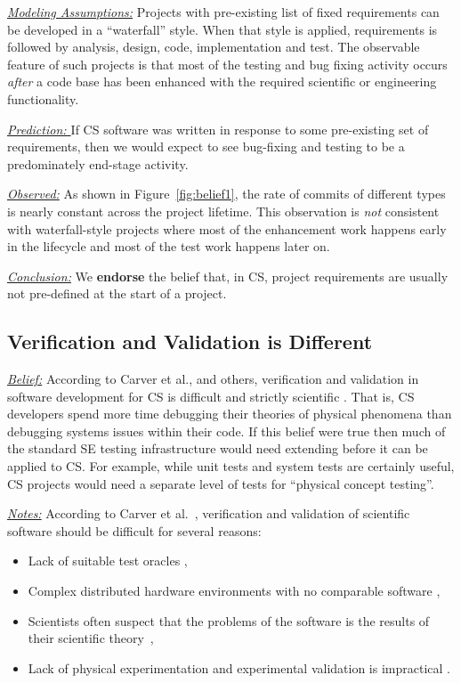 \documentclass[sigconf]{acmart}
\newcommand{\bi}{\begin{itemize}}
\newcommand{\ei}{\end{itemize}}
\newcommand{\fig}[1]{Figure~\ref{fig:#1}}
\newenvironment{RQ}{\vspace{1mm}\begin{tcolorbox}[enhanced,width=3.4in,size=fbox,colback=red!5!white,drop shadow southeast,sharp corners]}{\end{tcolorbox}}
\begin{document}
\noindent \textit{\underline{Modeling Assumptions:}} 
Projects with pre-existing list of fixed requirements 
can be developed in a ``waterfall'' style.
When that style is applied,
requirements is followed by analysis,
design, code, implementation and test.
The observable feature of such projects
is that most of the testing and bug fixing
activity occurs {\em after} a code base
has been enhanced with the required
scientific or engineering functionality.



\noindent \textit{\underline{Prediction: }} If CS software was written in response to some pre-existing set of requirements, then
we would expect to see bug-fixing and testing to be a predominately end-stage activity.






\noindent \textit{\underline{Observed:}} 
As shown in \fig{belief1}, the rate
of commits of different types
is nearly constant across the project
lifetime. This observation is {\em not} consistent with 
waterfall-style projects where most of the enhancement work happens early in the lifecycle and most of the test work happens later on.
\vspace{-2mm}
\begin{RQ}
\textit{\underline{Conclusion:}}
We \textbf{endorse} the belief that, in CS, project requirements are usually not pre-defined
at the start of a project.
\end{RQ}
 


\subsection{Verification and Validation is Different}\label{vv}
\textit{\underline{Belief:}} 
According to Carver et al., and others, 
verification and validation in software development for CS is difficult and strictly scientific \cite{carver07_environment, kanewala13_testing, carver06_hpc, Prabhu11_cssurvey, basili08_hpc}.
That is, CS developers spend more time debugging their theories
of physical phenomena than debugging systems issues within their code.
If this belief were true then much of the standard SE testing
infrastructure would need extending before it can be applied to CS. For example,
while unit tests and system tests are certainly useful, CS projects would need a separate level of tests for ``physical concept testing''. 

\noindent \textit{\underline{Notes:}} 
According to Carver et al.~\cite{carver07_environment},
verification and validation of scientific software should be difficult for several reasons:
\bi
  \item Lack of suitable test oracles \cite{kanewala13_testing},
  \item Complex distributed hardware environments with no comparable software \cite{basili08_hpc},
  \item Scientists often suspect that the problems of the software is the results of their scientific theory~\cite{faulk09_secs},
  \item Lack of physical experimentation and experimental validation is impractical \cite{carver07_environment}. 
\ei
\end{document}

